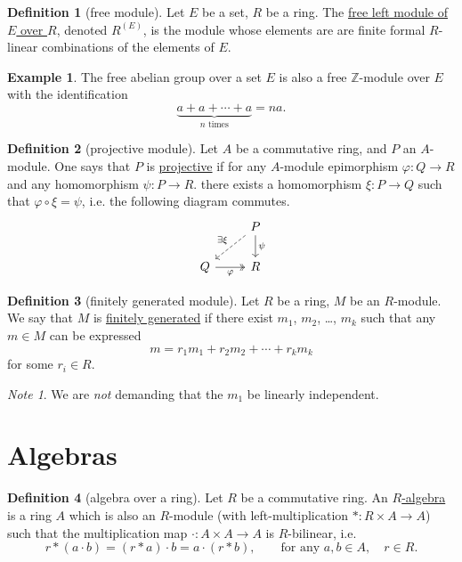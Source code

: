 \documentclass[a4paper,10pt]{scrreprt}
\newcommand{\Z}{\mathbb{Z}}
\newcommand{\defn}[1]{\ul{#1}}
\theoremstyle{definition}
\newtheorem{definition}{Definition}[section]
\newtheorem{example}{Example}[section]
\theoremstyle{plain}
\theoremstyle{remark}
\newtheorem{note}{Note}[section]
\begin{document}
\begin{definition}[free module]
  \label{def:freemodule}
  Let $E$ be a set, $R$ be a ring. The \defn{free left module of $E$ over $R$}, denoted $R^{(E)}$, is the module whose elements are are finite formal $R$-linear combinations of the elements of $E$.
\end{definition}

\begin{example}
  The free abelian group over a set $E$ is also a free $\Z$-module over $E$ with the identification
  \begin{equation*}
    \underbrace{a + a + \cdots + a}_{n\text{ times}} = na.
  \end{equation*}
\end{example}

\begin{definition}[projective module]
  \label{def:projectivemodule}
  Let $A$ be a commutative ring, and $P$ an $A$-module. One says that $P$ is \defn{projective} if for any $A$-module epimorphism $\varphi\colon Q \to R$ and any homomorphism $\psi\colon P \to R$. there exists a homomorphism $\xi\colon P \to Q$ such that $\varphi \circ \xi = \psi$, i.e. the following diagram commutes.
  \begin{equation*}
    \begin{tikzcd}
      & P
      \arrow[dl, swap, dashed, "\exists\xi"]
      \arrow[d, "\psi"]
      \\
      Q \arrow[r, swap, twoheadrightarrow, "\varphi"]
      & R
    \end{tikzcd}
  \end{equation*}
\end{definition}

\begin{definition}[finitely generated module]
  \label{def:finitelygeneratedmodule}
  Let $R$ be a ring, $M$ be an $R$-module. We say that $M$ is \defn{finitely generated} if there exist $m_{1}$, $m_{2}$, \dots, $m_{k}$ such that any $m \in M$ can be expressed 
  \begin{equation*}
    m = r_{1} m_{1} + r_{2} m_{2} + \cdots + r_{k} m_k
  \end{equation*}
  for some $r_{i} \in R$.
\end{definition}
\begin{note}
  We are \emph{not} demanding that the $m_{1}$ be linearly independent.
\end{note}

\section{Algebras}
\begin{definition}[algebra over a ring]
  \label{def:algebraoveraring}
  Let $R$ be a commutative ring. An \defn{$R$-algebra} is a ring $A$ which is also an $R$-module (with left-multiplication $*\colon R \times A \to A$) such that the multiplication map $\cdot\colon A \times A \to A$ is $R$-bilinear, i.e. 
  \begin{equation*}
    r*(a\cdot b) = (r*a)\cdot b = a\cdot (r*b),\qquad\text{for any }a,b \in A,\quad r \in R.
  \end{equation*}
\end{definition}
\end{document}

